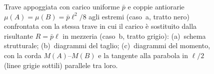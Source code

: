 \begin{figure}[htbp]
{
			}
			\caption{Trave appoggiata con carico uniforme $\bar p$ e coppie
				antiorarie $\mu(A) = \mu(B) = \bar p \ell^2/8$ agli estremi
				(caso~a, tratto nero) confrontata con la stessa trave in cui
				il carico è sostituito dalla risultante $R = \bar p \ell$
				in mezzeria (caso~b, tratto grigio): (a)~schema strutturale;
				(b)~diagrammi del taglio; (c)~diagrammi del momento, con la
				corda $M(A)$--$M(B)$ e la tangente alla parabola in $\ell/2$
				(linee grigie sottili) parallele tra loro.}
			\label{fig:stat_sovrapposizione_01}
		\end{figure}
